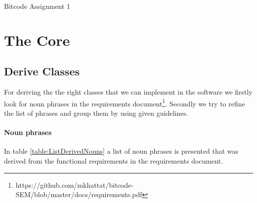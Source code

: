 \documentclass{article}
\begin{document}

\begin{titlepage}
	\Huge{Bitcode Assignment 1}
\end{titlepage}


\section{The Core}

\subsection{Derive Classes}
For deriving the the right classes that we can implement in the software we firstly look for noun phrases in the requirements document\footnote{https://github.com/mkhattat/bitcode-SEM/blob/master/docs/requirements.pdf}. Secondly we try to refine the list of phrases and group them by using given guidelines.

\paragraph{Noun phrases}
In table \ref{table:ListDerivedNouns} a list of noun phrases is presented that was derived from the functional requirements in the requirements document.
\end{document}
